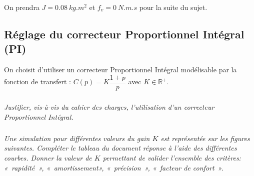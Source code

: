\documentclass[10pt,fleqn]{article} %
\begin{document}
On prendra $J=\SI{0,08}{kg.m^2}$ et $f_v=\SI{0}{N.m.s}$ pour la suite du sujet.


\subsection{Réglage du correcteur Proportionnel Intégral (PI)}
On choisit d’utiliser un correcteur Proportionnel Intégral modélisable par la fonction de transfert :
$C(p)=K\dfrac{1+p}{p}$  avec $K\in \mathbb{R}^+$.



\subparagraph{}
\textit{Justifier, vis-à-vis du cahier des charges, l’utilisation d’un correcteur Proportionnel Intégral.}



\subparagraph{}
\textit{Une simulation pour différentes valeurs du gain $K$ est représentée sur les figures suivantes. Compléter le tableau du document réponse à l’aide des différentes courbes. Donner la valeur de $K$ permettant de valider l’ensemble des critères: «~rapidité~», «~amortissement», «~précision~», «~facteur de confort~».}
\end{document}
